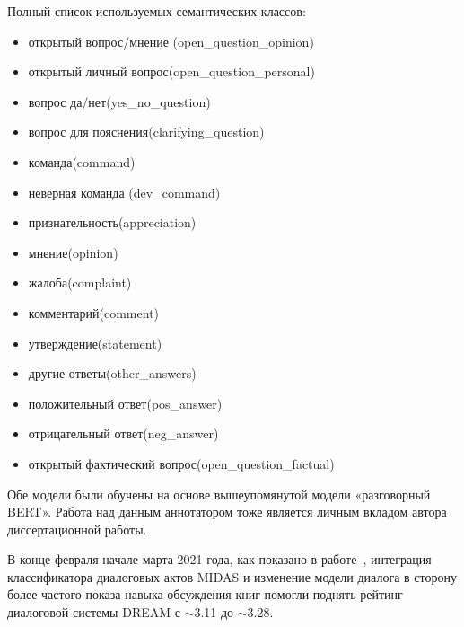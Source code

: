 Полный список используемых семантических классов:
\begin{itemize}
\item открытый вопрос/мнение (open\_question\_opinion)
\item открытый личный вопрос(open\_question\_personal)
\item вопрос да/нет(yes\_no\_question)
\item вопрос для пояснения(clarifying\_question)
\item команда(command)
\item неверная команда (dev\_command)
\item признательность(appreciation)
\item мнение(opinion)
\item жалоба(complaint)
\item комментарий(comment)
\item утверждение(statement)
\item другие ответы(other\_answers)
\item положительный ответ(pos\_answer)
\item отрицательный ответ(neg\_answer)
\item открытый фактический вопрос(open\_question\_factual)
\end{itemize}
Обе модели были обучены на основе вышеупомянутой модели «разговорный BERT».  Работа над данным аннотатором тоже является личным вкладом автора диссертационной работы.

В конце февраля-начале марта 2021 года, как показано  в работе~\cite{dream2}, интеграция классификатора диалоговых актов MIDAS и изменение модели диалога в сторону более частого показа навыка обсуждения книг помогли поднять рейтинг диалоговой системы {DREAM} с $\sim$3.11 до $\sim$3.28.



